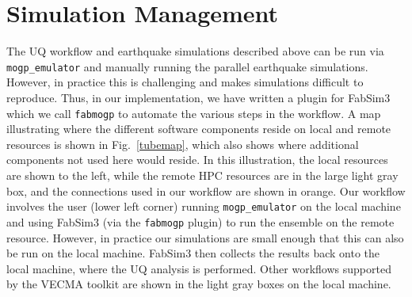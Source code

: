 \documentclass[openacc]{rstransa}%
\begin{document}
\section{Simulation Management}

The UQ workflow and earthquake simulations described above can be run via \texttt{mogp\_emulator} and
manually running the parallel earthquake simulations. However, in practice this is challenging
and makes simulations difficult to reproduce. Thus, in our implementation, we have written a plugin
for FabSim3 which we call \texttt{fabmogp} to automate the various steps in the workflow. A map illustrating
where the different software components reside on local and remote resources is shown in
Fig.~\ref{tubemap}, which also shows where additional components not used here would reside.
In this illustration, the local resources are shown to the left, while the remote HPC
resources are in the large light gray box, and the connections used in our workflow are shown in orange.
Our workflow involves the user (lower left corner) running \texttt{mogp\_emulator} on
the local machine and using FabSim3 (via the \texttt{fabmogp} plugin) to run the ensemble
on the remote resource. However, in practice our simulations are small enough that this can also
be run on the local machine. FabSim3 then collects the results back onto the local machine,
where the UQ analysis is performed. Other workflows supported by the VECMA toolkit are shown
in the light gray boxes on the local machine.
\end{document}
